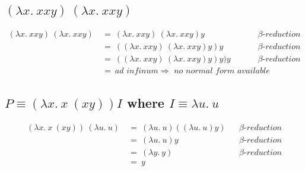 \documentclass{report}
\begin{document}
		\subsection{$(\lambda x . \ xxy) \ (\lambda x . \ xxy)$}
		\startsection
			\begin{align*}
				(\lambda x . \ xxy) \ (\lambda x . \ xxy) \ & = \ (\lambda x . \ xxy) \ (\lambda x . \ xxy) y  && \beta \textit{-reduction} \\
				& = \ ((\lambda x . \ xxy) \ (\lambda x . \ xxy) y) y  && \beta \textit{-reduction} \\
				& = \ ((\lambda x . \ xxy) \ (\lambda x . \ xxy) y) y) y && \beta \textit{-reduction} \\
				& = \ \textit{ad infinum} \Rightarrow \textit{ no normal form available}
		\end{align*}
		\closesection
		\subsection{$P  \equiv (\lambda x. \ x \ (xy)) I $ where $I \equiv \lambda u. \ u$}
		\startsection
			\begin{align*}
				(\lambda x. \ x \ (xy)) \ (\lambda u. \ u) \ & = \ (\lambda u. \ u) ((\lambda u. \ u) y) && \beta \textit{-reduction} \\
				& = \ (\lambda u. \ u)y && \beta \textit{-reduction} \\
				& = \ (\lambda y. \ y) && \beta \textit{-reduction} \\
				& = \ y \\
			\end{align*}
		\closesection
	\closesection
\end{document}
